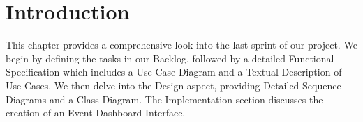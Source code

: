 \section*{Introduction}

This chapter provides a comprehensive look into the last sprint of our project. We begin by defining the tasks in our Backlog, followed by a detailed Functional Specification which includes a Use Case Diagram and a Textual Description of Use Cases. We then delve into the Design aspect, providing Detailed Sequence Diagrams and a Class Diagram. The Implementation section discusses the creation of an Event Dashboard Interface.